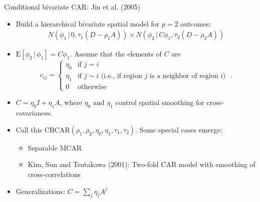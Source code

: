 \documentclass[10pt]{beamer}
\newcommand{\given}{\, | \,}
\begin{document}
\begin{frame}{Conditional bivariate CAR: Jin et al. (2005)}
 \begin{itemize}
  \item Build a hierarchical bivariate spatial model for $p=2$ outcomes:
  \begin{align*}
   N(\phi_1 \given 0, \tau_1(D-\rho_1 A)) \times N(\phi_2 \given C\phi_1, \tau_2(D - \rho_2 A))
  \end{align*}

  \item $\mbox{E}[\phi_2\given \phi_1] = C\phi_1$. Assume that the elements of $C$ are 
\[
c_{ij}=\left\{\begin{array}{ll}   \eta_0 & \mbox{if $j=i$} \\
\eta_{1} &  \mbox{if $j \sim i$ (i.e., if region $j$ is a neighbor of region $i$)} \\
0 & \mbox{otherwise}
\end{array} \right. \; .
\]

 \item $C = \eta_0 I + \eta_1 A$, where $\eta_0$ and $\eta_1$ control spatial smoothing for cross-covariances.
 
 \item Call this $\mbox{CBCAR}(\rho_1, \rho_2, \eta_0, \eta_1, \tau_1, \tau_2)$. Some special cases emerge:
    \begin{itemize}
     \item Separable MCAR     
     \item Kim, Sun and Tsutakawa (2001): Two-fold CAR model with smoothing of cross-correlations
    \end{itemize}
 \item Generalizations: $C = \sum_{j} \eta_j A^{j}$   
 \end{itemize}

\end{frame}
\end{document}
